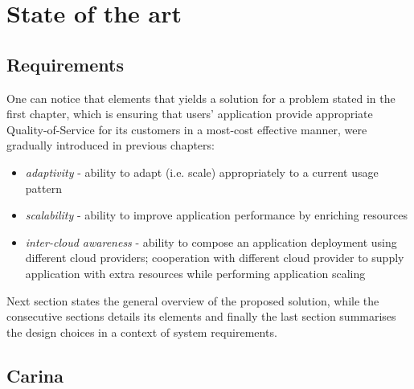 \chapter{State of the art} 


\section{Requirements}
One can notice that elements that yields a solution for a problem stated in the first chapter, which is ensuring that users' application provide appropriate Quality-of-Service for its customers in a most-cost effective manner, were gradually introduced in previous chapters:

\begin{itemize}
	\item \emph{adaptivity} - ability to adapt (i.e. scale) appropriately to a current usage pattern
	\item \emph{scalability} - ability to improve application performance by enriching resources
	\item \emph{inter-cloud awareness} - ability to compose an application deployment using different cloud providers; cooperation with different cloud provider to supply application with extra resources while performing application scaling
\end{itemize}

Next section states the general overview of the proposed solution, while the consecutive sections details its elements and finally the last section summarises the design choices in a context of system requirements.
	
\section{Carina}

